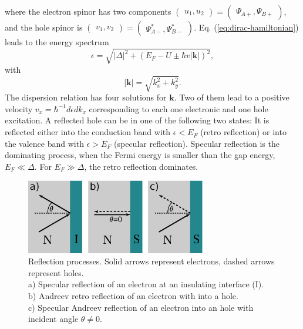 where the electron spinor has two components $\begin{pmatrix} u_1, u_2\end{pmatrix} = \begin{pmatrix} \Psi_{A+}, \Psi_{B+} \end{pmatrix}$, and the hole spinor is $\begin{pmatrix} v_1, v_2\end{pmatrix} = \begin{pmatrix} \Psi^{*}_{A-},  \Psi^{*}_{B-} \end{pmatrix}$.
Eq. (\ref{eq:dirac-hamiltonian}) leads to the energy spectrum
\begin{equation}
\epsilon = \sqrt{|\Delta|^2 + \left( E_F - U \pm \hbar v |\mathbf{k}|\right) ^2},  
\end{equation}
with
\begin{equation}
|\mathbf{k}| = \sqrt{k_x^2 + k_y^2}.
\end{equation}
The dispersion relation has four solutions for $\mathbf{k}$. Two of them lead to a positive velocity $v_x = \hbar^{-1} d \epsilon d k_x$ corresponding to each one electronic and one hole excitation. A reflected hole can be in one of the following two states: It is reflected either into the conduction band with $\epsilon < E_F$ (retro reflection) or into the valence band with $\epsilon > E_F$ (specular reflection). Specular reflection is the dominating process, when the Fermi energy is smaller than the gap energy, $E_F \ll \Delta$. For $E_F \gg \Delta$, the retro reflection dominates. 
\begin{figure}
\centering
\includegraphics[width=0.7\textwidth]{figure/framework-analytical/specular-reflection_csch}
\caption{Reflection processes. Solid arrows represent electrons, dashed arrows represent holes. \\ a) Specular reflection of an electron at an insulating interface (I). \\ b) Andreev retro reflection of an electron with into a hole. \\ c) Specular Andreev reflection of an electron into an hole with incident angle $\theta \neq 0$.}\label{fig:specular-sns}
\end{figure}

 
